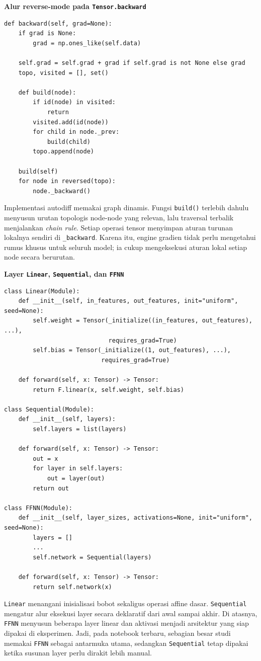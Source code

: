 \documentclass{article}
\begin{document}
\noindent\textbf{Alur reverse-mode pada \texttt{Tensor.backward}}\par
\begin{lstlisting}
def backward(self, grad=None):
    if grad is None:
        grad = np.ones_like(self.data)

    self.grad = self.grad + grad if self.grad is not None else grad
    topo, visited = [], set()

    def build(node):
        if id(node) in visited:
            return
        visited.add(id(node))
        for child in node._prev:
            build(child)
        topo.append(node)

    build(self)
    for node in reversed(topo):
        node._backward()
\end{lstlisting}
Implementasi autodiff memakai graph dinamis. Fungsi \texttt{build()} terlebih dahulu menyusun urutan topologis node-node yang relevan, lalu traversal terbalik menjalankan \textit{chain rule}. Setiap operasi tensor menyimpan aturan turunan lokalnya sendiri di \texttt{\_backward}. Karena itu, engine gradien tidak perlu mengetahui rumus khusus untuk seluruh model; ia cukup mengeksekusi aturan lokal setiap node secara berurutan.

\noindent\textbf{Layer \texttt{Linear}, \texttt{Sequential}, dan \texttt{FFNN}}\par
\begin{lstlisting}
class Linear(Module):
    def __init__(self, in_features, out_features, init="uniform", seed=None):
        self.weight = Tensor(_initialize((in_features, out_features), ...),
                             requires_grad=True)
        self.bias = Tensor(_initialize((1, out_features), ...),
                           requires_grad=True)

    def forward(self, x: Tensor) -> Tensor:
        return F.linear(x, self.weight, self.bias)

class Sequential(Module):
    def __init__(self, layers):
        self.layers = list(layers)

    def forward(self, x: Tensor) -> Tensor:
        out = x
        for layer in self.layers:
            out = layer(out)
        return out

class FFNN(Module):
    def __init__(self, layer_sizes, activations=None, init="uniform", seed=None):
        layers = []
        ...
        self.network = Sequential(layers)

    def forward(self, x: Tensor) -> Tensor:
        return self.network(x)
\end{lstlisting}
\texttt{Linear} menangani inisialisasi bobot sekaligus operasi affine dasar. \texttt{Sequential} mengatur alur eksekusi layer secara deklaratif dari awal sampai akhir. Di atasnya, \texttt{FFNN} menyusun beberapa layer linear dan aktivasi menjadi arsitektur yang siap dipakai di eksperimen. Jadi, pada notebook terbaru, sebagian besar studi memakai \texttt{FFNN} sebagai antarmuka utama, sedangkan \texttt{Sequential} tetap dipakai ketika susunan layer perlu dirakit lebih manual.
\end{document}
